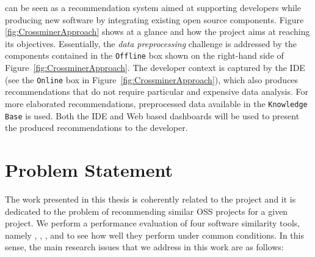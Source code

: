 \CROSSMINER can be seen as a recommendation system aimed at supporting developers while producing new software by integrating existing open source components. Figure \ref{fig:CrossminerApproach} shows \CROSSMINER at a glance and how the project aims at reaching its objectives. Essentially, the \textit{data preprocessing} challenge is addressed by the \CROSSMINER components contained in the \texttt{Offline} box shown on the right-hand side of Figure~\ref{fig:CrossminerApproach}. The developer context is captured by the IDE (see the \texttt{Online} box in Figure~\ref{fig:CrossminerApproach}), which also produces recommendations that do not require particular and expensive data analysis. For more elaborated recommendations, preprocessed data available in the \texttt{Knowledge Base} is used. Both the IDE and Web based dashboards will be used to present the produced recommendations to the developer. 


\section{Problem Statement}

The work presented in this thesis is coherently related to the \projectName project and it is dedicated to the problem of recommending similar OSS projects for a given project. We perform a performance evaluation of four software similarity tools, namely \MUDABlue \cite{10.1109/APSEC.2004.69}, \CLAN \cite{McMillan:2012:DSS:2337223.2337267}, \RepoPal \cite{10.1109/SANER.2017.7884605}, and \CrossSim \cite{NDRDSEAA2018} to see how well they perform under common conditions. In this sense, the main research issues that we address in this work are as follows:


